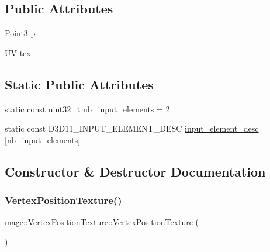 \subsection*{Public Attributes}
\begin{DoxyCompactItemize}
\item 
\hyperlink{structmage_1_1_point3}{Point3} \hyperlink{structmage_1_1_vertex_position_texture_a49253c4db52d1a4905838ba6ed6c52c6}{p}
\item 
\hyperlink{structmage_1_1_u_v}{UV} \hyperlink{structmage_1_1_vertex_position_texture_a9b4efa25d268c812892ecffc2582496e}{tex}
\end{DoxyCompactItemize}
\subsection*{Static Public Attributes}
\begin{DoxyCompactItemize}
\item 
static const uint32\+\_\+t \hyperlink{structmage_1_1_vertex_position_texture_a1ef796b1dfad7a11d03120cb65a8cdb4}{nb\+\_\+input\+\_\+elements} = 2
\item 
static const D3\+D11\+\_\+\+I\+N\+P\+U\+T\+\_\+\+E\+L\+E\+M\+E\+N\+T\+\_\+\+D\+E\+SC \hyperlink{structmage_1_1_vertex_position_texture_afbe5de758f42c05cdb10c493f90b6fca}{input\+\_\+element\+\_\+desc} \mbox{[}\hyperlink{structmage_1_1_vertex_position_texture_a1ef796b1dfad7a11d03120cb65a8cdb4}{nb\+\_\+input\+\_\+elements}\mbox{]}
\end{DoxyCompactItemize}


\subsection{Constructor \& Destructor Documentation}
\hypertarget{structmage_1_1_vertex_position_texture_ada4dbdc6e21b7408f1bfe69d821a4b48}{}\label{structmage_1_1_vertex_position_texture_ada4dbdc6e21b7408f1bfe69d821a4b48} 
\subsubsection{\texorpdfstring{Vertex\+Position\+Texture()}{VertexPositionTexture()}\hspace{0.1cm}{\footnotesize\ttfamily [1/4]}}
{\footnotesize\ttfamily mage\+::\+Vertex\+Position\+Texture\+::\+Vertex\+Position\+Texture (\begin{DoxyParamCaption}{ }\end{DoxyParamCaption})\hspace{0.3cm}{\ttfamily [default]}}

